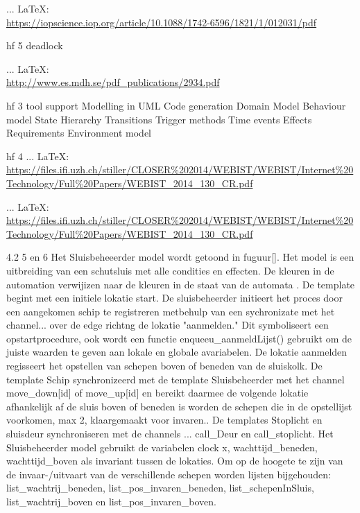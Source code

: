 \begin{thebibliography}{99}
{{ ... \LaTeX:\\ \url{https://iopscience.iop.org/article/10.1088/1742-6596/1821/1/012031/pdf}

hf 5
deadlock

 ... \LaTeX:\\ \url{http://www.es.mdh.se/pdf_publications/2934.pdf}

hf 3 tool support
Modelling in UML
Code generation
Domain Model
Behaviour model
State Hierarchy
Transitions
Trigger methods
Time events
Effects
Requirements
Environment model

hf 4
 ... \LaTeX:\\ \url{https://files.ifi.uzh.ch/stiller/CLOSER%202014/WEBIST/WEBIST/Internet%20Technology/Full%20Papers/WEBIST_2014_130_CR.pdf}


 ... \LaTeX:\\ \url{https://files.ifi.uzh.ch/stiller/CLOSER%202014/WEBIST/WEBIST/Internet%20Technology/Full%20Papers/WEBIST_2014_130_CR.pdf}

4.2 5 en 6
Het Sluisbeheeerder model wordt getoond in fuguur[]. Het model is een uitbreiding van een schutsluis met alle condities en effecten. De kleuren in de automation verwijizen naar de kleuren in de staat van de automata . De template begint met een initiele lokatie start. De sluisbeheerder initieert het proces door een aangekomen schip te registreren metbehulp van een sychronizate met het channel... over de edge richtng de lokatie "aanmelden." Dit symboliseert een opstartprocedure, ook wordt een functie enqueeu_aanmeldLijst() gebruikt om de juiste waarden te geven aan lokale en globale avariabelen. De lokatie aanmelden regisseert het opstellen van schepen boven of beneden van de sluiskolk. De template Schip synchronizeerd met de template Sluisbeheerder met het channel move_down[id] of move_up[id] en bereikt daarmee de volgende lokatie afhankelijk af de sluis boven of beneden is worden de schepen die in de opstellijst voorkomen, max 2, klaargemaakt voor invaren.. De templates Stoplicht en sluisdeur synchroniseren met de channels ... call_Deur en call_stoplicht.
Het Sluisbeheerder model gebruikt de variabelen clock x, wachttijd_beneden, wachttijd_boven als invariant tussen de lokaties. Om op de hoogete te zijn van de invaar-/uitvaart van de verschillende schepen worden lijsten bijgehouden: list_wachtrij_beneden, list_pos_invaren_beneden, list_schepenInSluis, list_wachtrij_boven en list_pos_invaren_boven.

}}
\end{thebibliography}
